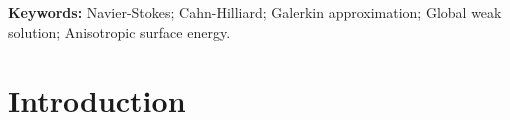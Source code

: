 \documentclass[11pt]{article}
\begin{document}
\date{}
\maketitle
\begin{abstract}
{\bfseries Abstract.}\quad We study the anisotropic, incompressible Cahn-Hilliard-Navier-Stokes system with variable density in a bounded smooth domain 
$\Omega \subset \mathbb{R}^d$. This work extends previous results on the isotropic case by incorporating anisotropic surface energy, represented by 
$\mathfrak{F}= \int_{\Omega} \frac{\epsilon}{2}\, \Gamma^2(\nabla \phi) $. The thermodynamic consistency of this system, as well as its modeling background and physical motivation, has been established in \cite{anderson2000phase,taylor-cahn98, zaidni2024}. Using a Galerkin approximation scheme, we prove the existence of global weak solutions in both two- and three-dimensions $(d=2,3)$. A key ingredient in extending the local existence of approximate solutions to a global one is the application of Bihari's inequality combined with a fixed-point argument.
\end{abstract}

\noindent\textbf{Keywords:} {Navier-Stokes; Cahn-Hilliard; Galerkin approximation; Global weak solution; Anisotropic surface energy.}

\section{Introduction}
\end{document}
